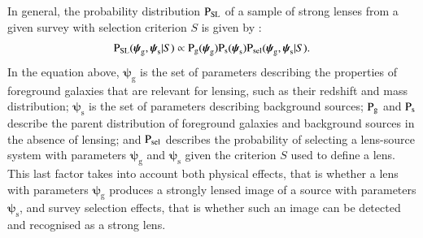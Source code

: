 \documentclass{aa}
\def\psilens{\boldsymbol{\psi}_\mathrm{g}}
\def\psisource{\boldsymbol{\psi}_\mathrm{s}}
\def\prlens{{\rm P}_\mathrm{g}}
\def\prsource{{\rm P}_\mathrm{s}}
\def\prsl{{\rm P}_\mathrm{{SL}}}
\def\psel{{\rm P}_\mathrm{sel}}
\begin{document}
In general, the probability distribution $\prsl$ of a sample of strong lenses from a given survey with selection criterion $S$ is given by \citep{Son22}:
\begin{equation}\label{eq:one}
\prsl(\psilens,\psisource|S) \propto \prlens(\psilens)\prsource(\psisource)\psel(\psilens,\psisource|S).
\end{equation}
In the equation above, $\psilens$ is the set of parameters describing the properties of foreground galaxies that are relevant for lensing, such as their redshift and mass distribution; $\psisource$ is the set of parameters describing background sources; $\prlens$ and $\prsource$ describe the parent distribution of foreground galaxies and background sources in the absence of lensing; and $\psel$ describes the probability of selecting a lens-source system with parameters $\psilens$ and $\psisource$ given the criterion $S$ used to define a lens.
This last factor takes into account both physical effects, that is whether a lens with parameters $\psilens$ produces a strongly lensed image of a source with parameters $\psisource$, and survey selection effects, that is whether such an image can be detected and recognised as a strong lens.
\end{document}
